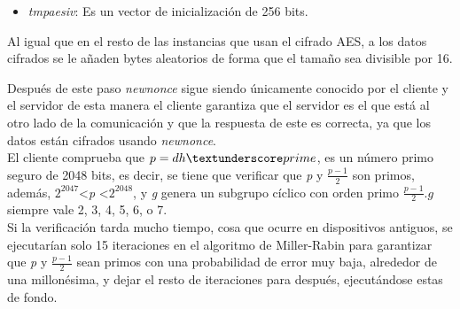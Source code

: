 \begin{enumerate}
\begin{itemize}
\begin{itemize}
\begin{itemize}
					\item \emph{tmp\textunderscore aes\textunderscore iv}: Es un vector de inicialización de 256 bits.
				\end{itemize}
				Al igual que en el resto de las instancias que usan el cifrado AES, a los datos cifrados se le añaden bytes aleatorios de forma que el tamaño sea divisible por 16.
			\end{itemize}
		\end{itemize}
	Después de este paso \emph{new\textunderscore nonce} sigue siendo únicamente conocido por el cliente y el servidor de esta manera el cliente garantiza que el servidor es el que está al otro lado de la comunicación y que la respuesta de este es correcta, ya que los datos están cifrados usando \emph{new\textunderscore nonce}.\\
	El cliente comprueba que $p=dh\textunderscore prime$, es un número primo seguro de 2048 bits, es decir, se tiene que verificar que \emph{p} y $\frac{p-1}{2}$ son primos, además, $2^{2047}$\textless \emph{p} \textless $2^{2048}$, y \emph{g} genera un subgrupo cíclico con orden primo $\frac{p-1}{2}$.$g$ siempre vale 2, 3, 4, 5, 6, o 7.\\
	Si la verificación tarda mucho tiempo, cosa que ocurre en dispositivos antiguos, se ejecutarían solo 15 iteraciones en el algoritmo de Miller-Rabin para garantizar que \emph{p} y $\frac{p-1}{2}$ sean primos con una probabilidad de error muy baja, alrededor de una millonésima, y dejar el resto de iteraciones para después, ejecutándose estas de fondo.


\end{enumerate}
